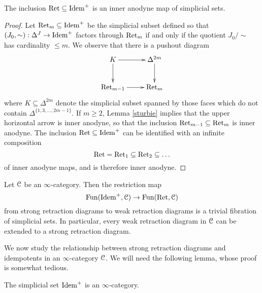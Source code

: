 \begin{proposition}
The inclusion $\operatorname{Ret} \subseteq \operatorname{Idem}^{+}$ is an inner anodyne map of simplicial sets.
\end{proposition}

\begin{proof}
Let $\operatorname{Ret}_{m} \subseteq \operatorname{Idem}^{+}$ be the simplicial subset defined so that
$(J_0, \sim): \Delta^{J} \rightarrow \operatorname{Idem}^{+}$ factors through $\operatorname{Ret}_m$ if and only if
the quotient $J_0 / \sim$ has cardinality $\leq m$. We observe that there is a pushout diagram
$$ \xymatrix{ K \ar[r] \ar[d] & \Delta^{2m} \ar[d] \\
\Ret_{m-1} \ar[r] & \Ret_{m} }$$
where $K \subseteq \Delta^{2m}$ denote the simplicial subset spanned by those faces
which do not contain $\Delta^{ \{1, 3, \ldots, 2m-1\} }$. If $m \geq 2$, Lemma \ref{sturbie} implies that the upper horizontal arrow is inner anodyne, so that the inclusion
$\operatorname{Ret}_{m-1} \subseteq \operatorname{Ret}_{m}$ is inner anodyne. The inclusion
$\operatorname{Ret} \subseteq \operatorname{Idem}^{+}$ can be identified with an infinite composition
$$ \operatorname{Ret} = \operatorname{Ret}_{1} \subseteq \operatorname{Ret}_{2} \subseteq \ldots $$
of inner anodyne maps, and is therefore inner anodyne.
\end{proof}

\begin{corollary}\label{gurgh}
Let $\operatorname{\mathcal{C}}$ be an $\infty$-category. Then the restriction map
$$ \operatorname{Fun}(\operatorname{Idem}^{+}, \operatorname{\mathcal{C}}) \rightarrow \operatorname{Fun}(\operatorname{Ret}, \operatorname{\mathcal{C}})$$ from strong retraction diagrams
to weak retraction diagrams is a trivial fibration of simplicial sets. In particular,
every weak retraction diagram in $\operatorname{\mathcal{C}}$ can be extended to a strong retraction diagram.
\end{corollary}

We now study the relationship between strong retraction diagrams and idempotents in an $\infty$-category $\operatorname{\mathcal{C}}$. We will need the following lemma, whose proof is somewhat tedious.

\begin{lemma}
The simplicial set $\operatorname{Idem}^{+}$ is an $\infty$-category.
\end{lemma}

